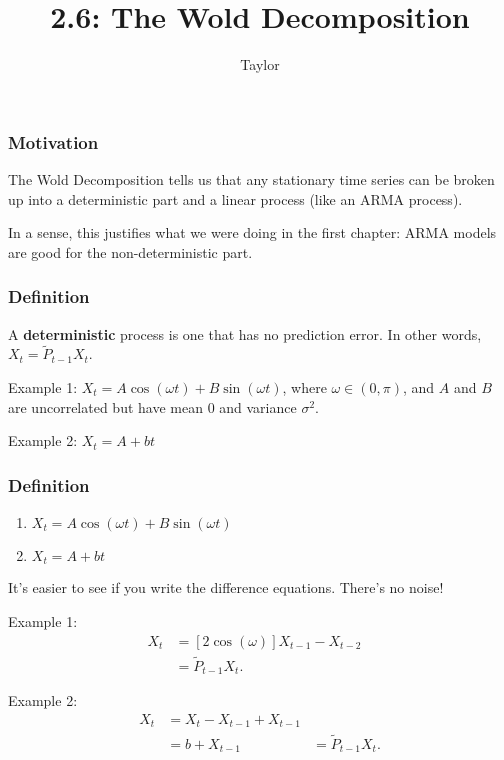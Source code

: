 \documentclass{beamer}
\title["2.6"]{2.6: The Wold Decomposition}
\author{Taylor}
\institute[UVA] 
{
University of Virginia \\
\medskip
\textit{} 
}
\date{}
\begin{document}

\begin{frame}
\titlepage 
\end{frame}

\begin{frame}
\frametitle{Motivation}

The Wold Decomposition tells us that any stationary time series can be broken up into a deterministic part and a linear process (like an ARMA process).

In a sense, this justifies what we were doing in the first chapter: ARMA models are good for the non-deterministic part.

\end{frame}


\begin{frame}
\frametitle{Definition}

A {\bf deterministic} process is one that has no prediction error. In other words, $X_t = \tilde{P}_{t-1}X_t$.
\newline

Example 1: $X_t = A \cos(\omega t) + B \sin(\omega t)$, where $\omega \in (0,\pi)$, and $A$ and $B$ are uncorrelated but have mean $0$ and variance $\sigma^2$. 
\newline

Example 2: $X_t = A + b t$

\end{frame}


\begin{frame}
\frametitle{Definition}

\begin{enumerate}
\item $X_t = A \cos(\omega t) + B \sin(\omega t)$ 
\item $X_t = A + b t$
\end{enumerate}
It's easier to see if you write the difference equations. There's no noise!
\newline

Example 1: 
\begin{align*}
X_t &= [2 \cos(\omega)] X_{t-1} - X_{t-2} & \tag{trig identities}\\
&= \tilde{P}_{t-1} X_t.
\end{align*}

Example 2: 
\begin{align*}
X_t &= X_t - X_{t-1} +X_{t-1} \\
&= b + X_{t-1}
&= \tilde{P}_{t-1} X_t.
\end{align*}

\end{frame}
\end{document}
